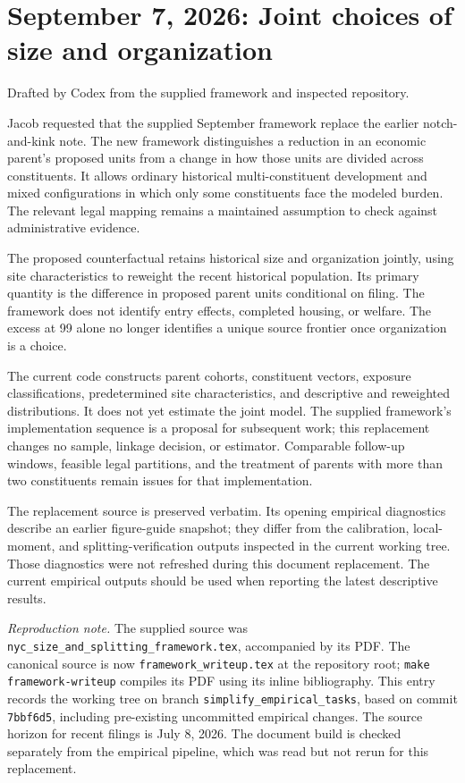 \section*{September 7, 2026: Joint choices of size and organization}
{\small Drafted by Codex from the supplied framework and inspected repository.}

Jacob requested that the supplied September framework replace the earlier
notch-and-kink note. The new framework distinguishes a reduction in an economic
parent's proposed units from a change in how those units are divided across
constituents. It allows ordinary historical multi-constituent development and
mixed configurations in which only some constituents face the modeled burden.
The relevant legal mapping remains a maintained assumption to check against
administrative evidence.

The proposed counterfactual retains historical size and organization jointly,
using site characteristics to reweight the recent historical population. Its
primary quantity is the difference in proposed parent units conditional on
filing. The framework does not identify entry effects, completed housing, or
welfare. The excess at 99 alone no longer identifies a unique source frontier
once organization is a choice.

The current code constructs parent cohorts, constituent vectors, exposure
classifications, predetermined site characteristics, and descriptive and
reweighted distributions. It does not yet estimate the joint model. The
supplied framework's implementation sequence is a proposal for subsequent work;
this replacement changes no sample, linkage decision, or estimator. Comparable
follow-up windows, feasible legal partitions, and the treatment of parents with
more than two constituents remain issues for that implementation.

The replacement source is preserved verbatim. Its opening empirical diagnostics
describe an earlier figure-guide snapshot; they differ from the calibration,
local-moment, and splitting-verification outputs inspected in the current
working tree. Those diagnostics were not refreshed during this document
replacement. The current empirical outputs should be used when reporting the
latest descriptive results.

{\small\textit{Reproduction note.}
The supplied source was
\texttt{nyc\_size\_and\_splitting\_framework.tex}, accompanied by its PDF.
The canonical source is now \texttt{framework\_writeup.tex} at the repository
root; \texttt{make framework-writeup} compiles its PDF using its inline
bibliography. This entry records the working tree on branch
\texttt{simplify\_empirical\_tasks}, based on commit \texttt{7bbf6d5}, including
pre-existing uncommitted empirical changes. The source horizon for recent
filings is July 8, 2026. The document build is checked separately from the
empirical pipeline, which was read but not rerun for this replacement.}

